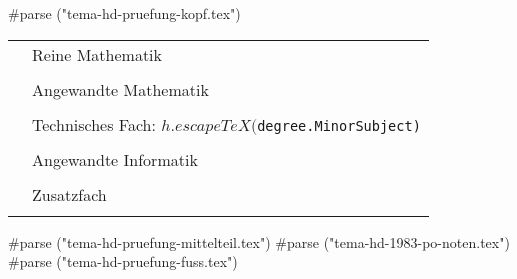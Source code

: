 


#parse ("tema-hd-pruefung-kopf.tex")
\vspace*{0.2cm}

\renewcommand{\arraystretch}{1.4}
\begin{center}
\begin{tabular}{|c|p{14.6cm}|}
\hline
\hspace*{0.3cm} 
& {\large Reine Mathematik} \\\\
\hline
& {\large Angewandte Mathematik }\\\\
\hline 
& {\large Technisches Fach: {\tt $h.escapeTeX($degree.MinorSubject)}}\\\\
\hline
& {\large Angewandte Informatik}\\\\
\hline
& {\large Zusatzfach} \\\\
\hline
\end{tabular}
\end{center}
\renewcommand{\arraystretch}{1}
\normalsize

#parse ("tema-hd-pruefung-mittelteil.tex")
\vspace*{0.3cm}
#parse ("tema-hd-1983-po-noten.tex")
#parse ("tema-hd-pruefung-fuss.tex")

